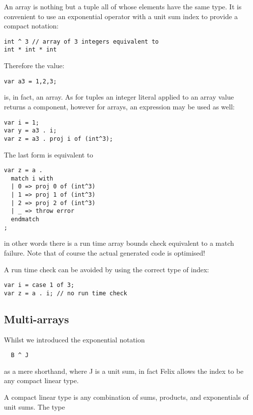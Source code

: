\documentclass[oneside]{book}
\begin{document}
An array is nothing but a tuple all of whose elements have the
same type. It is convenient to use an exponential operator with
a  unit sum index to provide a compact notation:

\begin{verbatim}
int ^ 3 // array of 3 integers equivalent to
int * int * int
\end{verbatim}

Therefore the value:

\begin{verbatim}
var a3 = 1,2,3;
\end{verbatim}

is, in fact, an array. As for tuples an integer literal applied
to an array value returns a component, however for arrays,
an expression may be used as well:

\begin{verbatim}
var i = 1;
var y = a3 . i;
var z = a3 . proj i of (int^3);
\end{verbatim}

The last form is equivalent to

\begin{verbatim}
var z = a . 
  match i with
  | 0 => proj 0 of (int^3)
  | 1 => proj 1 of (int^3)
  | 2 => proj 2 of (int^3)
  | _ => throw error
  endmatch
;
\end{verbatim}

in other words there is a run time array bounds check equivalent to a match failure.
Note that of course the actual generated code is optimised!

A run time check can be avoided by using the correct type of index:

\begin{verbatim}
var i = case 1 of 3;
var z = a . i; // no run time check
\end{verbatim}


\subsection{Multi-arrays}
Whilst we introduced the exponential notation

\begin{verbatim}
  B ^ J
\end{verbatim}

as a mere shorthand, where J is a unit sum, in fact Felix allows
the index to be any compact linear type.

A compact linear type is any combination of sums, products,
and exponentials of unit sums. The type
\end{document}
